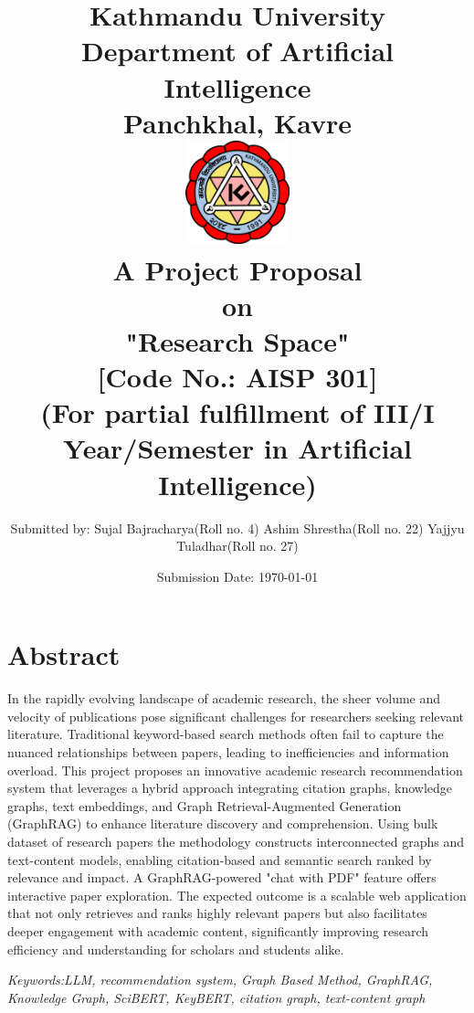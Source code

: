 \documentclass[a4paper,12pt]{article}
\title{
\textbf{
    Kathmandu University \\
    \large{Department of Artificial Intelligence}\\
    \normalsize{Panchkhal, Kavre}\\[1.5cm]}
    \includegraphics[width=3cm]{KU-Logo.png}\\[1cm]
    \normalsize{A Project Proposal\\on\\
    \textbf{"Research Space"}}\\[0.5cm]
    \normalsize{[Code No.: AISP 301]\\
    (For partial fulfillment of III/I Year/Semester in Artificial Intelligence)}\\[1cm]
}
\author[ ]{\normalsize{
        Submitted by: \linebreak
        Sujal Bajracharya(Roll no. 4)\linebreak
        Ashim Shrestha(Roll no. 22)\linebreak
        Yajjyu Tuladhar(Roll no. 27)
}}
\affil[ ]{\vspace{0.3cm}}
\affil[ ]{\normalsize{
        Submitted to: \linebreak
        Subodh Acharya \linebreak
        Department of Artificial Intelligence
}}
\date{\normalsize{Submission Date: \today}}
\begin{document}
\maketitle
\thispagestyle{empty}
\restoregeometry

\newpage
\setcounter{page}{1}

\section*{Abstract}
In the rapidly evolving landscape of academic research, the sheer volume and velocity
of publications pose significant challenges for researchers seeking relevant
literature. Traditional keyword-based search methods often fail to capture the
nuanced relationships between papers, leading to inefficiencies and information
overload. This project proposes an innovative academic research recommendation system
that leverages a hybrid approach integrating citation graphs, knowledge graphs, text
embeddings, and Graph Retrieval-Augmented Generation (GraphRAG) to enhance literature
discovery and comprehension. Using bulk dataset of research papers the methodology
constructs interconnected graphs and text-content models, enabling citation-based and
semantic search ranked by relevance and impact. A GraphRAG-powered "chat with PDF"
feature offers interactive paper exploration. The expected outcome is a scalable web
application that not only retrieves and ranks highly relevant papers but also
facilitates deeper engagement with academic content, significantly improving research
efficiency and understanding for scholars and students alike.

\textit{Keywords:LLM, recommendation system, Graph Based Method, GraphRAG,
Knowledge Graph, SciBERT, KeyBERT, citation graph, text-content graph}
\newpage

\tableofcontents
\newpage

\listoffigures
\newpage

\printglossary[type=\acronymtype, title=Acronyms/Abbreviations]
\newpage
\end{document}
